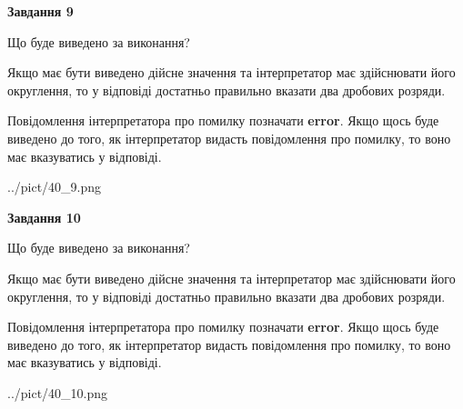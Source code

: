 \documentclass[12pt, ukrainian]{article}
\begin{document}
{\begin {Large}
{\begin {center}\textbf{Завдання 9}\end {center}}\par
Що буде виведено за виконання? \par

Якщо має бути виведено дійсне значення та інтерпретатор має здійснювати його округлення, 
то у відповіді достатньо правильно вказати два дробових розряди.

Повідомлення інтерпретатора про помилку позначати \textbf{error}.
Якщо щось буде виведено до того, як інтерпретатор видасть повідомлення про помилку, 
то воно має вказуватись у відповіді. \par

\begin{center}
	{../pict/40_9.png}
\end{center}
\newpage

{\begin {center}\textbf{Завдання 10}\end {center}}\par
Що буде виведено за виконання? \par

Якщо має бути виведено дійсне значення та інтерпретатор має здійснювати його округлення, 
то у відповіді достатньо правильно вказати два дробових розряди.

Повідомлення інтерпретатора про помилку позначати \textbf{error}.
Якщо щось буде виведено до того, як інтерпретатор видасть повідомлення про помилку, 
то воно має вказуватись у відповіді. \par

\begin{center}
	{../pict/40_10.png}
\end{center}
\newpage

\end {Large}}
\end{document}
